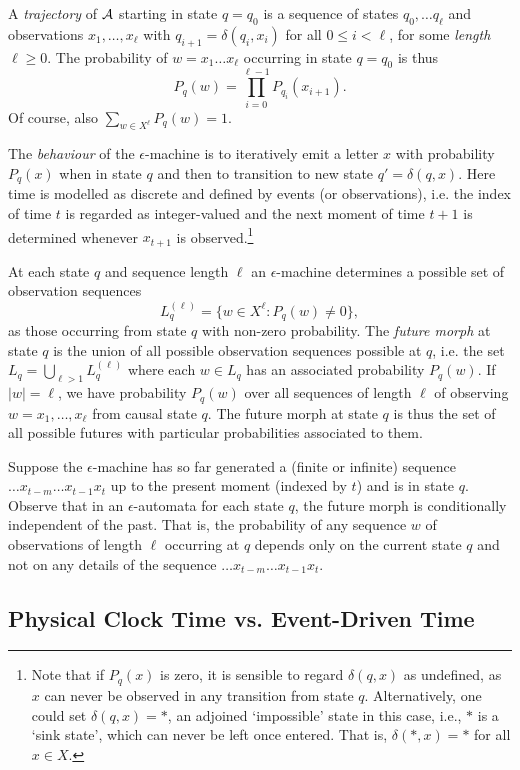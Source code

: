 \documentclass[journal]{IEEEtran}
\begin{document}
A {\em trajectory} of $\cal A$ starting in state $q=q_0$ is a sequence of states $q_0, \ldots q_{\ell}$ and observations $x_1,\ldots, x_{\ell}$ with
$q_{i+1}=\delta(q_i,x_i)$ for all $0\leq i < \ell$, for some {\em length} $\ell \geq 0$.  The probability of $w = x_1 \ldots x_{\ell}$ occurring in state $q=q_0$ 
is  thus $$P_q(w)=\prod_{i=0}^{\ell-1} P_{q_i}(x_{i+1}).$$    Of course, also
$\sum_{w \in X^{\ell}} P_q(w) =1$. 


The {\em behaviour} of the $\epsilon$-machine is to iteratively emit a letter $x$ with probability $P_q(x)$ when in state $q$ and then to transition to new state $q'=\delta(q,x)$.
Here time is modelled as discrete and defined by events (or observations), i.e. the index of time $t$ is regarded as integer-valued and the next moment of time $t+1$
is determined whenever $x_{t+1}$ is observed.\footnote{Note that if $P_q(x)$ is zero, it is sensible to regard $\delta(q,x)$ as undefined, as $x$ can never be observed in
any transition from state $q$. Alternatively, 
one could set  $\delta(q,x)= *$,  an adjoined `impossible' state in this case, i.e., $*$ is a `sink state', which can 
never be left once entered. That is,  $\delta(*,x)=*$ for all $x\in X$. }

At each state $q$ and sequence length $\ell$ an $\epsilon$-machine determines a possible set of observation sequences
 $$L_q^{(\ell)}=\{ w \in X^{\ell} : P_{q}(w) \neq 0 \},$$  as those occurring from state $q$ with non-zero probability.   The {\em future morph} at
 state $q$ is the union of all possible observation sequences  possible at $q$, i.e.
  the set $L_q=\bigcup_{\ell > 1} L_q^{(\ell)}$ where each $w \in L_q$ has an associated probability $P_q(w)$. If $|w|=\ell$,
  we have probability $P_q(w)$ over all sequences of length $\ell$ of observing $w=x_1,\ldots, x_{\ell}$ from causal state $q$. 
  The future morph at state $q$ is  thus the set of all possible futures with particular probabilities associated to them. 

Suppose the $\epsilon$-machine has so far generated a (finite or infinite) sequence 
$\ldots x_{t-m} \ldots  x_{t-1} x_t$  up to the present moment (indexed by $t$) and is in state $q$.  
Observe that in an $\epsilon$-automata for each state $q$, the future morph is conditionally independent of the past.
That is,  the probability of any sequence  $w$ of observations of length $\ell$  occurring at $q$ 
depends only on the current state $q$ and not on any details of the sequence $\ldots x_{t-m} \ldots  x_{t-1} x_t$.


\subsection{Physical Clock Time vs. Event-Driven Time }
\end{document}
